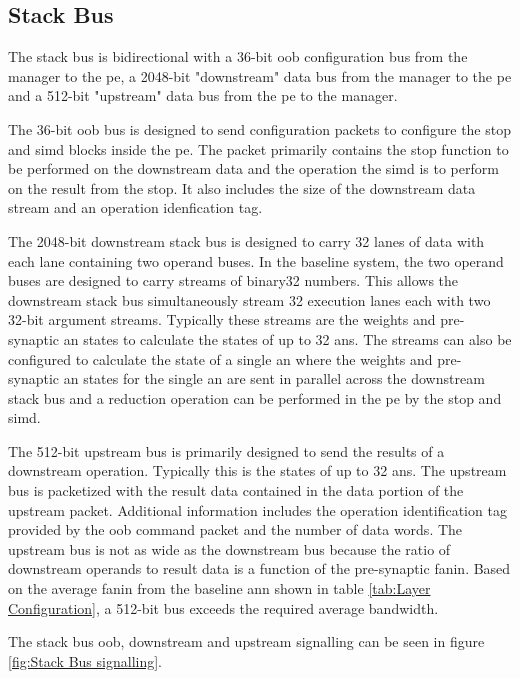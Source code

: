 \subsection{Stack Bus}
\label{sec:Stack Bus}

The stack bus is bidirectional with a 36-bit \ac{oob} configuration bus from the manager to the \ac{pe}, a 2048-bit "downstream" data bus from the manager to the \ac{pe} and a 512-bit "upstream" data bus from the \ac{pe} to the manager.

The 36-bit \ac{oob} bus is designed to send configuration packets to configure the \ac{stop} and \ac{simd} blocks inside the \ac{pe}.
The packet primarily contains the \ac{stop} function to be performed on the downstream data and the operation the \ac{simd} is to perform on the result from the \ac{stop}.
It also includes the size of the downstream data stream and an operation idenfication tag.

The 2048-bit downstream stack bus is designed to carry 32 lanes of data with each lane containing two operand buses. 
In the baseline system, the two operand buses are designed to carry streams of \ac{binary32} numbers.
This allows the downstream stack bus simultaneously stream 32 execution lanes each with two 32-bit argument streams. 
Typically these streams are the weights and pre-synaptic \ac{an} states to calculate the states of up to 32 \acp{an}. 
The streams can also be configured to calculate the state of a single \ac{an} where the weights and pre-synaptic \ac{an} states for the single \ac{an} are sent in parallel across the downstream stack bus and a reduction operation can be performed in the \ac{pe} by the \ac{stop} and \ac{simd}.

The 512-bit upstream bus is primarily designed to send the results of a downstream operation. Typically this is the states of up to 32 \acp{an}.
The upstream bus is packetized with the result data contained in the data portion of the upstream packet.
Additional information includes the operation identification tag provided by the \ac{oob} command packet and the number of data words.
The upstream bus is not as wide as the downstream bus because the ratio of downstream operands to result data is a function of the pre-synaptic fanin.
Based on the average fanin from the baseline \ac{ann} shown in table \ref{tab:Layer Configuration}, a 512-bit bus exceeds the required average bandwidth.

The stack bus \ac{oob}, downstream and upstream signalling can be seen in figure \ref{fig:Stack Bus signalling}.

